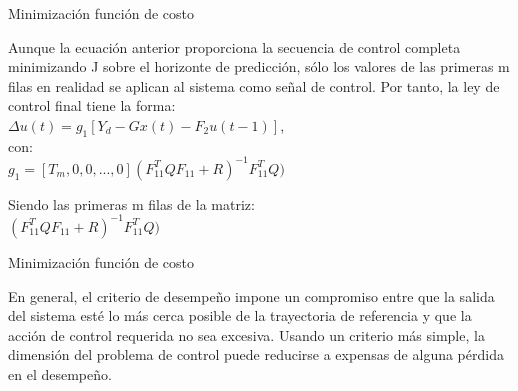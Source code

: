 \documentclass{beamer}
\begin{document}
\begin{frame}{Minimización función de costo}
\begin{justify}
\vspace{0.3cm}
\begin{itemize}
Aunque la ecuación anterior proporciona la secuencia de control completa minimizando J sobre el horizonte de predicción, sólo los valores de las primeras m filas en realidad se aplican al sistema como señal de control. Por tanto, la ley de control final tiene la forma:
\\
\hfill \break
 $\Delta u(t)=g_1 \left [ Y_d- Gx(t)-F_2 u(t-1) \right ]$,
 \\
 con:
 \\
 $g_1=\left [T_m, 0, 0, ..., 0  \right ](F_{11}^T Q F_{11}+R)^{-1} F_{11}^T Q)$ 
\hfill \break

 Siendo las primeras m filas de la matriz:
 \\
 \centering
 $(F_{11}^T Q F_{11}+R)^{-1} F_{11}^T Q)$
\end{itemize}
\end{justify}
\end{frame}


\begin{frame}{Minimización función de costo}
\begin{justify}
\vspace{0.3cm}
\begin{itemize}
En general, el criterio de desempeño impone un compromiso entre que la salida del sistema esté lo más cerca posible de la trayectoria de referencia y que la acción de control requerida no sea excesiva. Usando un criterio más simple, la dimensión del problema de control puede reducirse a expensas de alguna pérdida en el desempeño.
\end{itemize}
\end{justify}
\end{frame}
\end{document}
